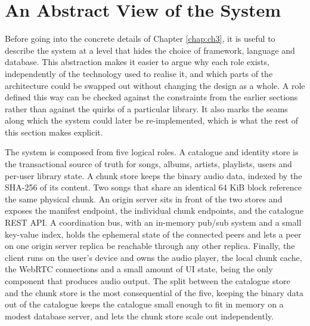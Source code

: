 \section{An Abstract View of the System}
\label{sec:system-abstraction}

\indent \par Before going into the concrete details of Chapter \ref{chap:ch3}, it is useful to describe the system at a level that hides the choice of framework, language and database. This abstraction makes it easier to argue why each role exists, independently of the technology used to realise it, and which parts of the architecture could be swapped out without changing the design as a whole. A role defined this way can be checked against the constraints from the earlier sections rather than against the quirks of a particular library. It also marks the seams along which the system could later be re-implemented, which is what the rest of this section makes explicit.

\par The system is composed from five logical roles. A catalogue and identity store is the transactional source of truth for songs, albums, artists, playlists, users and per-user library state. A chunk store keeps the binary audio data, indexed by the SHA-256 of its content. Two songs that share an identical 64 KiB block reference the same physical chunk. An origin server sits in front of the two stores and exposes the manifest endpoint, the individual chunk endpoints, and the catalogue REST API. A coordination bus, with an in-memory pub/sub system and a small key-value index, holds the ephemeral state of the connected peers and lets a peer on one origin server replica be reachable through any other replica. Finally, the client runs on the user's device and owns the audio player, the local chunk cache, the WebRTC connections and a small amount of UI state, being the only component that produces audio output. The split between the catalogue store and the chunk store is the most consequential of the five, keeping the binary data out of the catalogue keeps the catalogue small enough to fit in memory on a modest database server, and lets the chunk store scale out independently.

